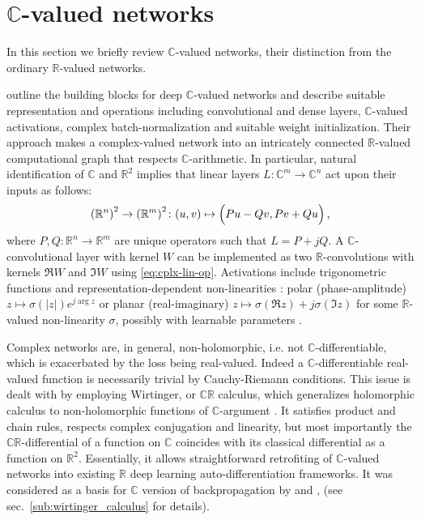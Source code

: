 \documentclass[a4paper,10pt]{article}
\newcommand{\real}{\mathbb{R}}
\newcommand{\cplx}{\mathbb{C}}
\newcommand{\important}[1]{\textbf{\!\colorbox{red}{#1}\!}}
\newcommand{\todo}[1]{{\color{blue} [TODO]} \important{#1}}
\begin{document}



\section{$\cplx$-valued networks} %
\label{sec:c_valued_networks}

In this section we briefly review $\cplx$-valued networks, their distinction from the
ordinary $\real$-valued networks.

\citet{trabelsi_deep_2017} outline the building blocks for deep $\cplx$-valued networks
and describe suitable representation and operations including convolutional and dense layers,
$\cplx$-valued activations, complex batch-normalization and suitable weight initialization.
Their approach makes a complex-valued network into an intricately connected $\real$-valued
computational graph that respects $\cplx$-arithmetic.
%
In particular, natural identification of $\cplx$ and $\real^2$ implies that linear layers $
  L \colon \cplx^m \to \cplx^n
$ act upon their inputs as follows:
\begin{equation}  \label{eq:cplx-lin-op}
  {(\real^n)}^{2}
    \to {(\real^m)}^{2}
    \colon (u, v)
      \mapsto \Bigl(
        P u - Q v,
        P v + Q u
      \Bigr)
    \,,
\end{equation}
where $
  P, Q \colon \real^{n} \to \real^{m}
$ are unique operators such that $L = P + j Q$. A $\cplx$-convolutional layer with kernel
$W$ can be implemented as two $\real$-convolutions with kernels $\Re{W}$ and $\Im{W}$ using
\eqref{eq:cplx-lin-op}. Activations include trigonometric functions and representation-dependent
non-linearities \citep{hirose_complex-valued_2009}: polar (phase-amplitude) $
  z \mapsto \sigma(\lvert z \rvert) e^{j \arg z}
$ or planar (real-imaginary) $
  z \mapsto \sigma(\Re z) + j \sigma(\Im z)
$ for some $\real$-valued non-linearity $\sigma$, possibly with learnable parameters
\citep{trabelsi_deep_2017,wolter_complex_2018}.

Complex networks are, in general, non-holomorphic, i.e. not $\cplx$-differentiable, which is
exacerbated by the loss being real-valued. Indeed a $\cplx$-differentiable real-valued function is
necessarily trivial by Cauchy-Riemann conditions. This issue is dealt with by employing Wirtinger,
or $\cplx\real$ calculus, which generalizes holomorphic calculus to non-holomorphic functions
of $\cplx$-argument \citep{adali_complex-valued_2011,boeddeker_computation_2019}. It satisfies
product and chain rules, respects complex conjugation and linearity, but most importantly the
$\cplx\real$-differential of a function on $\cplx$ coincides with its classical differential as
a function on $\real^2$. Essentially, it allows straightforward retrofiting of $\cplx$-valued
networks into existing $\real$ deep learning auto-differentiation frameworks. It was considered
as a basis for $\cplx$ version of backpropagation by \citet{benvenuto_complex_1992} and
\citet{trabelsi_deep_2017}, (see sec.~\ref{sub:wirtinger_calculus} for details).
\end{document}
